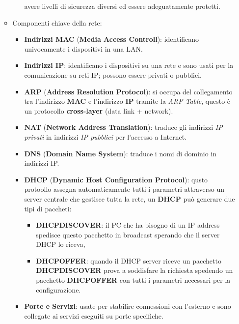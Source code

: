 \documentclass[12pt]{article}
\begin{document}
\begin{enumerate}
\begin{itemize}
\begin{itemize}
            avere livelli di sicurezza diversi ed essere adeguatamente protetti.
        \end{itemize}
        \item Componenti chiave della rete:
        \begin{itemize}
            \item \textbf{Indirizzi MAC} (\textbf{Media Access Controll}): 
            identificano univocamente i dispositivi in una LAN.
            \item \textbf{Indirizzi IP}: identificano i dispositivi su una rete 
            e sono usati per la comunicazione su reti IP; possono essere privati 
            o pubblici.
            \item \textbf{ARP} (\textbf{Address Resolution Protocol}): si occupa 
            del collegamento tra l'indirizzo \textbf{MAC} e l'indirizzo \textbf{IP} 
            tramite la \textit{ARP Table}, questo \`{e} un protocollo 
            \textbf{cross-layer} (data link + network).
            \item \textbf{NAT} (\textbf{Network Address Translation}): traduce 
            gli indirizzi \textit{IP privati} in indirizzi \textit{IP pubblici} 
            per l'accesso a Internet.
            \item \textbf{DNS} (\textbf{Domain Name System}): traduce i nomi di 
            dominio in indirizzi IP.
            \item \textbf{DHCP} (\textbf{Dynamic Host Configuration Protocol}): 
            qusto protoollo assegna automaticamente tutti i parametri attraverso
            un server centrale che gestisce tutta la rete, un \textbf{DHCP} pu\`{o}
            generare due tipi di paccheti:
            \begin{itemize}
                \item \textbf{DHCPDISCOVER}: il PC che ha bisogno di un IP address
                spedisce questo pacchetto in broadcast sperando che il server DHCP 
                lo riceva,
                \item \textbf{DHCPOFFER}: quando il DHCP server riceve un pacchetto
                \textbf{DHCPDISCOVER} prova a soddisfare la richiesta spedendo
                un pacchetto \textbf{DHCPOFFER} con tutti i parametri necessari 
                per la configurazione.
            \end{itemize} 
            \item \textbf{Porte e Servizi}: usate per stabilire connessioni con 
            l'esterno e sono collegate ai servizi eseguiti su porte specifiche. 

\end{itemize}
\end{itemize}
\end{enumerate}
\end{document}
